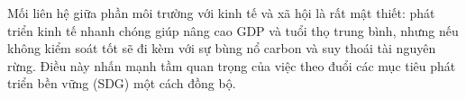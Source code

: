 Mối liên hệ giữa phần môi trường với kinh tế và xã hội là rất mật thiết: phát triển kinh tế nhanh chóng giúp nâng cao GDP và tuổi thọ trung bình, nhưng nếu không kiểm soát tốt sẽ đi kèm với sự bùng nổ carbon và suy thoái tài nguyên rừng. Điều này nhấn mạnh tầm quan trọng của việc theo đuổi các mục tiêu phát triển bền vững (SDG) một cách đồng bộ.
